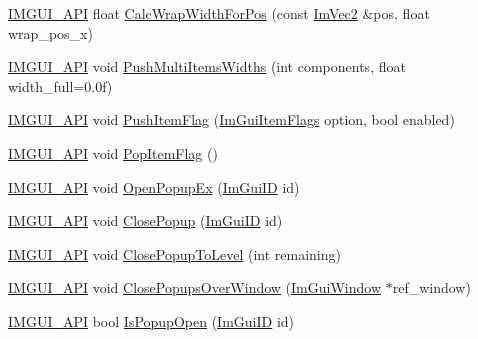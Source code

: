 \begin{DoxyCompactItemize}
\item 
\mbox{\hyperlink{imgui_8h_a43829975e84e45d1149597467a14bbf5}{I\+M\+G\+U\+I\+\_\+\+A\+PI}} float \mbox{\hyperlink{namespace_im_gui_a66416151e58c34cd02973976de66e0e9}{Calc\+Wrap\+Width\+For\+Pos}} (const \mbox{\hyperlink{struct_im_vec2}{Im\+Vec2}} \&pos, float wrap\+\_\+pos\+\_\+x)
\item 
\mbox{\hyperlink{imgui_8h_a43829975e84e45d1149597467a14bbf5}{I\+M\+G\+U\+I\+\_\+\+A\+PI}} void \mbox{\hyperlink{namespace_im_gui_ab913605fcf6d405d102cdf56cd414a5a}{Push\+Multi\+Items\+Widths}} (int components, float width\+\_\+full=0.\+0f)
\item 
\mbox{\hyperlink{imgui_8h_a43829975e84e45d1149597467a14bbf5}{I\+M\+G\+U\+I\+\_\+\+A\+PI}} void \mbox{\hyperlink{namespace_im_gui_ac7301f6378333f6d17f47823eed9e00a}{Push\+Item\+Flag}} (\mbox{\hyperlink{imgui__internal_8h_abcf9eafab4557e911b2c0d8fe2feeb38}{Im\+Gui\+Item\+Flags}} option, bool enabled)
\item 
\mbox{\hyperlink{imgui_8h_a43829975e84e45d1149597467a14bbf5}{I\+M\+G\+U\+I\+\_\+\+A\+PI}} void \mbox{\hyperlink{namespace_im_gui_aa93281155e1dd23715dbd384e91edc6b}{Pop\+Item\+Flag}} ()
\item 
\mbox{\hyperlink{imgui_8h_a43829975e84e45d1149597467a14bbf5}{I\+M\+G\+U\+I\+\_\+\+A\+PI}} void \mbox{\hyperlink{namespace_im_gui_a6ce26d34d09c7657d7abd8e28cbb1b85}{Open\+Popup\+Ex}} (\mbox{\hyperlink{imgui_8h_a1785c9b6f4e16406764a85f32582236f}{Im\+Gui\+ID}} id)
\item 
\mbox{\hyperlink{imgui_8h_a43829975e84e45d1149597467a14bbf5}{I\+M\+G\+U\+I\+\_\+\+A\+PI}} void \mbox{\hyperlink{namespace_im_gui_a7f3f82fc44d67af554faf104b913ea55}{Close\+Popup}} (\mbox{\hyperlink{imgui_8h_a1785c9b6f4e16406764a85f32582236f}{Im\+Gui\+ID}} id)
\item 
\mbox{\hyperlink{imgui_8h_a43829975e84e45d1149597467a14bbf5}{I\+M\+G\+U\+I\+\_\+\+A\+PI}} void \mbox{\hyperlink{namespace_im_gui_abaa7a1d867e9f6fbb8c7c20bf8344a8b}{Close\+Popup\+To\+Level}} (int remaining)
\item 
\mbox{\hyperlink{imgui_8h_a43829975e84e45d1149597467a14bbf5}{I\+M\+G\+U\+I\+\_\+\+A\+PI}} void \mbox{\hyperlink{namespace_im_gui_a2febc7edd279491870160d390fd6e2e5}{Close\+Popups\+Over\+Window}} (\mbox{\hyperlink{struct_im_gui_window}{Im\+Gui\+Window}} $\ast$ref\+\_\+window)
\item 
\mbox{\hyperlink{imgui_8h_a43829975e84e45d1149597467a14bbf5}{I\+M\+G\+U\+I\+\_\+\+A\+PI}} bool \mbox{\hyperlink{namespace_im_gui_ae747d8e0c6ff9c24535e9d07e9350397}{Is\+Popup\+Open}} (\mbox{\hyperlink{imgui_8h_a1785c9b6f4e16406764a85f32582236f}{Im\+Gui\+ID}} id)

\end{DoxyCompactItemize}
